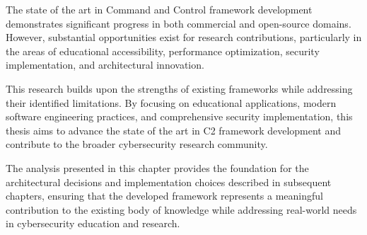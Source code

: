 The state of the art in Command and Control framework development demonstrates significant progress in both commercial and open-source domains. However, substantial opportunities exist for research contributions, particularly in the areas of educational accessibility, performance optimization, security implementation, and architectural innovation.

This research builds upon the strengths of existing frameworks while addressing their identified limitations. By focusing on educational applications, modern software engineering practices, and comprehensive security implementation, this thesis aims to advance the state of the art in C2 framework development and contribute to the broader cybersecurity research community.

The analysis presented in this chapter provides the foundation for the architectural decisions and implementation choices described in subsequent chapters, ensuring that the developed framework represents a meaningful contribution to the existing body of knowledge while addressing real-world needs in cybersecurity education and research.